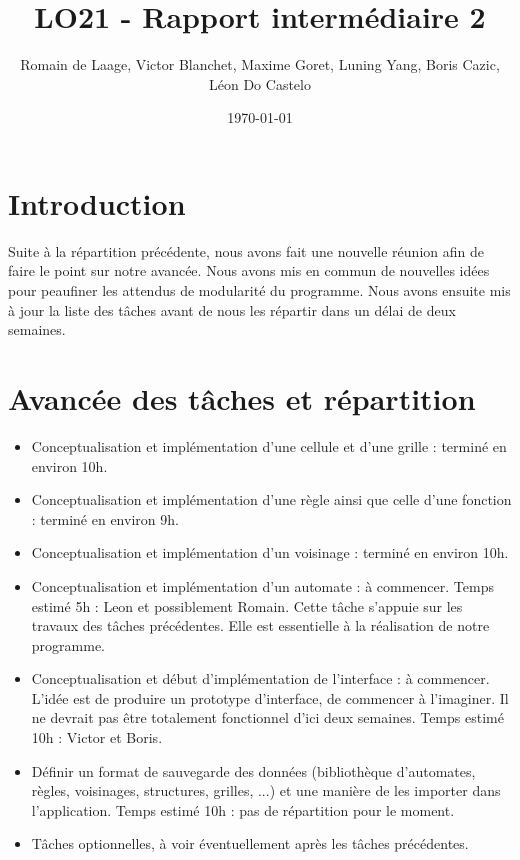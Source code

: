 \documentclass[11pt]{article}
\title{LO21 - Rapport intermédiaire 2}
\author{Romain de Laage, Victor Blanchet, Maxime Goret, Luning Yang, Boris Cazic, Léon Do Castelo}
\date{\today}
\begin{document}
\maketitle
\thispagestyle{fancy}

\section{Introduction}

Suite à la répartition précédente, nous avons fait une nouvelle réunion afin de faire le point sur notre avancée. Nous avons mis en commun de nouvelles idées pour peaufiner les attendus de modularité du programme. Nous avons ensuite mis à jour la liste des tâches avant de nous les répartir dans un délai de deux semaines.

\section{Avancée des tâches et répartition}

\begin{itemize}
    \item Conceptualisation et implémentation d'une cellule et d'une grille : terminé en environ 10h.
    \bigskip
    \item Conceptualisation et implémentation d'une règle ainsi que celle d'une fonction : terminé en environ 9h.
    \bigskip
    \item Conceptualisation et implémentation d'un voisinage : terminé en environ 10h.
    \bigskip
    \item Conceptualisation et implémentation d'un automate : à commencer. Temps estimé 5h : Leon et possiblement Romain. Cette tâche s'appuie sur les travaux des tâches précédentes. Elle est essentielle à la réalisation de notre programme.
    \bigskip
    \item Conceptualisation et début d'implémentation de l'interface : à commencer. L'idée est de produire un prototype d'interface, de commencer à l'imaginer. Il ne devrait pas être totalement fonctionnel d'ici deux semaines. Temps estimé 10h : Victor et Boris.
    \bigskip
    \item Définir un format de sauvegarde des données (bibliothèque d'automates, règles, voisinages, structures, grilles, ...) et une manière de les importer dans l'application. Temps estimé 10h : pas de répartition pour le moment.
    \bigskip
    \item Tâches optionnelles, à voir éventuellement après les tâches précédentes.
\end{itemize}
\end{document}
